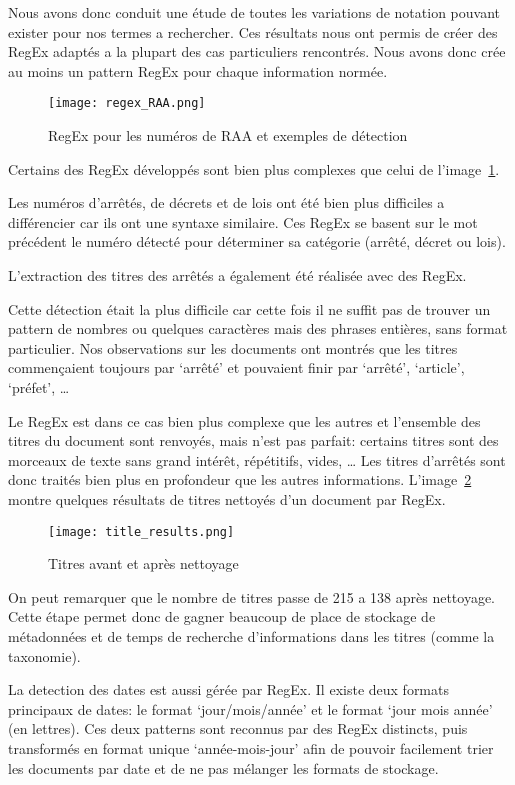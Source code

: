 Nous avons donc conduit une étude de toutes les variations de notation pouvant exister pour nos termes a rechercher.
Ces résultats nous ont permis de créer des RegEx adaptés a la plupart des cas particuliers rencontrés.
Nous avons donc crée au moins un pattern RegEx pour chaque information normée.

\begin{figure}[h!]
  \centering
  \texttt{[image: regex\_RAA.png]}
	\caption[]{RegEx pour les numéros de RAA et exemples de détection}
	\label{fig:regexRAA}
\end{figure}

Certains des RegEx développés sont bien plus complexes que celui de l'image~\ref{fig:regexRAA}.

Les numéros d'arrêtés, de décrets et de lois ont été bien plus difficiles a différencier car ils ont une syntaxe similaire.
Ces RegEx se basent sur le mot précédent le numéro détecté pour déterminer sa catégorie (arrêté, décret ou lois).


L'extraction des titres des arrêtés a également été réalisée avec des RegEx.

Cette détection était la plus difficile car cette fois il ne suffit pas de trouver un pattern de nombres ou quelques caractères mais des phrases entières, sans format particulier.
Nos observations sur les documents ont montrés que les titres commençaient toujours par `arrêté' et pouvaient finir par `arrêté', `article', `préfet', \ldots

Le RegEx est dans ce cas bien plus complexe que les autres et l'ensemble des titres du document sont renvoyés, mais n'est pas parfait: certains titres sont des morceaux de texte sans grand intérêt, répétitifs, vides, \ldots
Les titres d'arrêtés sont donc traités bien plus en profondeur que les autres informations.
L'image~\ref{fig:regexTitles} montre quelques résultats de titres nettoyés d'un document par RegEx.

\begin{figure}[h!]
  \centering
  \texttt{[image: title\_results.png]}
	\caption[]{Titres avant et après nettoyage}
	\label{fig:regexTitles}
\end{figure}

On peut remarquer que le nombre de titres passe de 215 a 138 après nettoyage.
Cette étape permet donc de gagner beaucoup de place de stockage de métadonnées et de temps de recherche d'informations dans les titres (comme la taxonomie).


La detection des dates est aussi gérée par RegEx.
Il existe deux formats principaux de dates: le format `jour/mois/année' et le format `jour mois année' (en lettres).
Ces deux patterns sont reconnus par des RegEx distincts, puis transformés en format unique `année-mois-jour' afin de pouvoir facilement trier les documents par date et de ne pas mélanger les formats de stockage.


